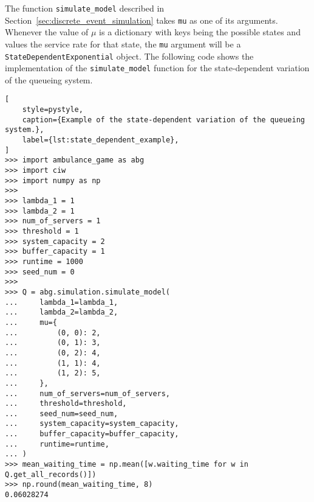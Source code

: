 The function \texttt{simulate\_model} described in
Section~\ref{sec:discrete_event_simulation} takes \texttt{mu} as one of its
arguments.
Whenever the value of \(\mu\) is a dictionary with keys being the possible
states and values the service rate for that state, the \texttt{mu} argument
will be a \texttt{StateDependentExponential} object.
The following code shows the implementation of the
\texttt{simulate\_model} function for the state-dependent variation of the
queueing system.

\begin{lstlisting}[
    style=pystyle,
    caption={Example of the state-dependent variation of the queueing system.},
    label={lst:state_dependent_example},
]
>>> import ambulance_game as abg
>>> import ciw
>>> import numpy as np
>>>
>>> lambda_1 = 1
>>> lambda_2 = 1
>>> num_of_servers = 1
>>> threshold = 1
>>> system_capacity = 2
>>> buffer_capacity = 1
>>> runtime = 1000
>>> seed_num = 0
>>>
>>> Q = abg.simulation.simulate_model(
...     lambda_1=lambda_1,
...     lambda_2=lambda_2,
...     mu={
...         (0, 0): 2,
...         (0, 1): 3,
...         (0, 2): 4,
...         (1, 1): 4,
...         (1, 2): 5,
...     },
...     num_of_servers=num_of_servers,
...     threshold=threshold,
...     seed_num=seed_num,
...     system_capacity=system_capacity,
...     buffer_capacity=buffer_capacity,
...     runtime=runtime,
... )
>>> mean_waiting_time = np.mean([w.waiting_time for w in Q.get_all_records()])
>>> np.round(mean_waiting_time, 8)
0.06028274

\end{lstlisting}
